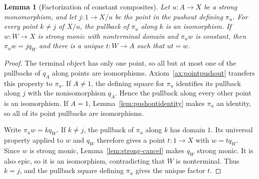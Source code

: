 \documentclass[11pt,a4paper]{article}
\theoremstyle{plain}
\newtheorem{lemma}[theorem]{Lemma}
\theoremstyle{definition}
\theoremstyle{remark}
\newcommand{\one}{1}
\begin{document}
\begin{lemma}[Factorization of constant composites]\label{lem:constantfactor}
Let $u:A\to X$ be a strong monomorphism, and let $j:\one\to X/u$
be the point in the pushout defining $\pi_u$.
For every point $k\ne j$ of $X/u$, the pullback of $\pi_u$ along
$k$ is an isomorphism.
If $w:W\to X$ is strong monic with nonterminal domain and $\pi_u w$
is constant, then $\pi_u w=jq_W$ and there is a unique $t:W\to A$
such that $ut=w$.
\end{lemma}
\begin{proof}
The terminal object has only one point, so all but at most one
of the pullbacks of $q_A$ along points are isomorphisms.
Axiom~\ref{ax:pointpushout} transfers this property to $\pi_u$.
If $A\ne\one$, the defining square for $\pi_u$ identifies its
pullback along $j$ with the nonisomorphism $q_A$. Hence the pullback
along every other point is an isomorphism. If $A=\one$,
Lemma~\ref{lem:pushoutidentity} makes $\pi_u$ an identity, so all
of its point pullbacks are isomorphisms.

Write $\pi_u w=kq_W$. If $k\ne j$, the pullback of $\pi_u$ along $k$ has domain
$\one$. Its universal property applied to $w$ and $q_W$ therefore
gives a point $t:\one\to X$ with $w=tq_W$. Since $w$ is strong
monic, Lemma~\ref{lem:strong-cancel} makes $q_W$ strong monic. It is also epic, so it is an
isomorphism, contradicting that $W$ is nonterminal. Thus $k=j$,
and the pullback square defining $\pi_u$ gives the unique factor $t$.
\end{proof}
\end{document}
